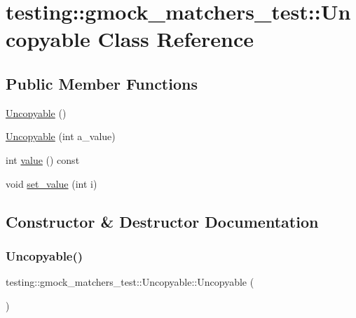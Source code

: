 \hypertarget{classtesting_1_1gmock__matchers__test_1_1Uncopyable}{}\section{testing\+::gmock\+\_\+matchers\+\_\+test\+::Uncopyable Class Reference}
\label{classtesting_1_1gmock__matchers__test_1_1Uncopyable}
\subsection*{Public Member Functions}
\begin{DoxyCompactItemize}
\item 
\mbox{\hyperlink{classtesting_1_1gmock__matchers__test_1_1Uncopyable_a29cd3836f686c1e9c47e5e0f98c56b13}{Uncopyable}} ()
\item 
\mbox{\hyperlink{classtesting_1_1gmock__matchers__test_1_1Uncopyable_a827c1de4fe4c2e40791dd87a13972bc7}{Uncopyable}} (int a\+\_\+value)
\item 
int \mbox{\hyperlink{classtesting_1_1gmock__matchers__test_1_1Uncopyable_a23512131b948e40ded06555848829866}{value}} () const
\item 
void \mbox{\hyperlink{classtesting_1_1gmock__matchers__test_1_1Uncopyable_a3f30b54f22caac3aa7e6fb79012dc52f}{set\+\_\+value}} (int i)
\end{DoxyCompactItemize}


\subsection{Constructor \& Destructor Documentation}
\mbox{\label{classtesting_1_1gmock__matchers__test_1_1Uncopyable_a29cd3836f686c1e9c47e5e0f98c56b13}} 
\subsubsection{\texorpdfstring{Uncopyable()}{Uncopyable()}\hspace{0.1cm}{\footnotesize\ttfamily [1/2]}}
{\footnotesize\ttfamily testing\+::gmock\+\_\+matchers\+\_\+test\+::\+Uncopyable\+::\+Uncopyable (\begin{DoxyParamCaption}{ }\end{DoxyParamCaption})\hspace{0.3cm}{\ttfamily [inline]}}

